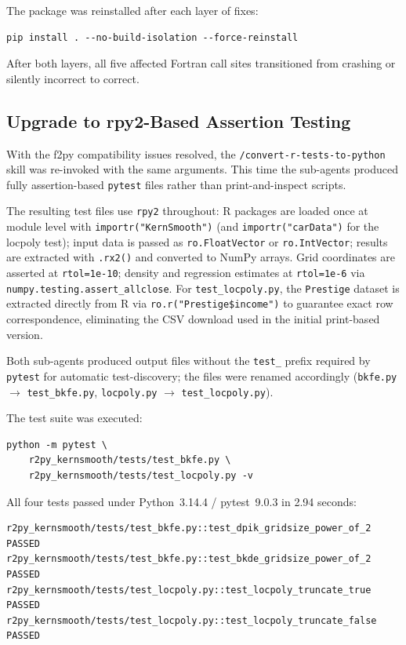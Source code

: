 \documentclass[12pt,a4paper]{article}
\begin{document}
The package was reinstalled after each layer of fixes:

\begin{lstlisting}[style=shell]
pip install . --no-build-isolation --force-reinstall
\end{lstlisting}

After both layers, all five affected Fortran call sites transitioned from crashing or silently incorrect to correct.

\subsection{Upgrade to rpy2-Based Assertion Testing}

With the f2py compatibility issues resolved, the \texttt{/convert-r-tests-to-python} skill was re-invoked with the same arguments. This time the sub-agents produced fully assertion-based \texttt{pytest} files rather than print-and-inspect scripts.

The resulting test files use \texttt{rpy2} throughout: R packages are loaded once at module level with \texttt{importr("KernSmooth")} (and \texttt{importr("carData")} for the locpoly test); input data is passed as \texttt{ro.FloatVector} or \texttt{ro.IntVector}; results are extracted with \texttt{.rx2()} and converted to NumPy arrays. Grid coordinates are asserted at \texttt{rtol=1e-10}; density and regression estimates at \texttt{rtol=1e-6} via \texttt{numpy.testing.assert\_allclose}. For \texttt{test\_locpoly.py}, the \texttt{Prestige} dataset is extracted directly from R via \texttt{ro.r("Prestige\$income")} to guarantee exact row correspondence, eliminating the CSV download used in the initial print-based version.

Both sub-agents produced output files without the \texttt{test\_} prefix required by \texttt{pytest} for automatic test-discovery; the files were renamed accordingly (\texttt{bkfe.py} $\to$ \texttt{test\_bkfe.py}, \texttt{locpoly.py} $\to$ \texttt{test\_locpoly.py}).

The test suite was executed:

\begin{lstlisting}[style=shell]
python -m pytest \
    r2py_kernsmooth/tests/test_bkfe.py \
    r2py_kernsmooth/tests/test_locpoly.py -v
\end{lstlisting}

All four tests passed under Python~3.14.4 / pytest~9.0.3 in 2.94 seconds:

\begin{lstlisting}[style=shell]
r2py_kernsmooth/tests/test_bkfe.py::test_dpik_gridsize_power_of_2   PASSED
r2py_kernsmooth/tests/test_bkfe.py::test_bkde_gridsize_power_of_2   PASSED
r2py_kernsmooth/tests/test_locpoly.py::test_locpoly_truncate_true    PASSED
r2py_kernsmooth/tests/test_locpoly.py::test_locpoly_truncate_false   PASSED
\end{lstlisting}
\end{document}
